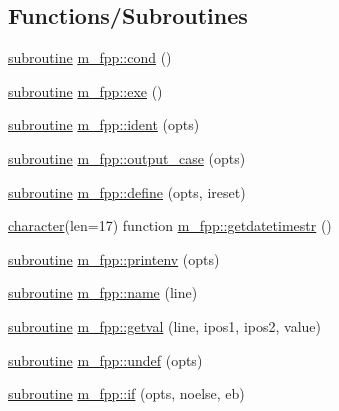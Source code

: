 \subsection*{Functions/\+Subroutines}
\begin{DoxyCompactItemize}
\item 
\hyperlink{M__stopwatch_83_8txt_acfbcff50169d691ff02d4a123ed70482}{subroutine} \hyperlink{namespacem__fpp_a3aa7c291b265d02ad91b3bb29e797156}{m\+\_\+fpp\+::cond} ()
\item 
\hyperlink{M__stopwatch_83_8txt_acfbcff50169d691ff02d4a123ed70482}{subroutine} \hyperlink{namespacem__fpp_a1149aa9cc5620d40fa315e4de3937776}{m\+\_\+fpp\+::exe} ()
\item 
\hyperlink{M__stopwatch_83_8txt_acfbcff50169d691ff02d4a123ed70482}{subroutine} \hyperlink{namespacem__fpp_afe91155aa0c891fc35f3927e777440ea}{m\+\_\+fpp\+::ident} (opts)
\item 
\hyperlink{M__stopwatch_83_8txt_acfbcff50169d691ff02d4a123ed70482}{subroutine} \hyperlink{namespacem__fpp_aeab3b5145d977b953ea972b2882e442a}{m\+\_\+fpp\+::output\+\_\+case} (opts)
\item 
\hyperlink{M__stopwatch_83_8txt_acfbcff50169d691ff02d4a123ed70482}{subroutine} \hyperlink{namespacem__fpp_a43f195db2d7dcdbaf89cb2e45ca60421}{m\+\_\+fpp\+::define} (opts, ireset)
\item 
\hyperlink{option__stopwatch_83_8txt_abd4b21fbbd175834027b5224bfe97e66}{character}(len=17) function \hyperlink{namespacem__fpp_aa52b30ff734a7831d3334aee5ef4e8e7}{m\+\_\+fpp\+::getdatetimestr} ()
\item 
\hyperlink{M__stopwatch_83_8txt_acfbcff50169d691ff02d4a123ed70482}{subroutine} \hyperlink{namespacem__fpp_a8034546d38694c17677cf638e2760d43}{m\+\_\+fpp\+::printenv} (opts)
\item 
\hyperlink{M__stopwatch_83_8txt_acfbcff50169d691ff02d4a123ed70482}{subroutine} \hyperlink{namespacem__fpp_ac32c830615f875efaf8678759daa7f39}{m\+\_\+fpp\+::name} (line)
\item 
\hyperlink{M__stopwatch_83_8txt_acfbcff50169d691ff02d4a123ed70482}{subroutine} \hyperlink{namespacem__fpp_a77ebcaafb7e1396c68dbc0bdcc088232}{m\+\_\+fpp\+::getval} (line, ipos1, ipos2, value)
\item 
\hyperlink{M__stopwatch_83_8txt_acfbcff50169d691ff02d4a123ed70482}{subroutine} \hyperlink{namespacem__fpp_aa3c22b47ddfcf47940f8254d4a44c448}{m\+\_\+fpp\+::undef} (opts)
\item 
\hyperlink{M__stopwatch_83_8txt_acfbcff50169d691ff02d4a123ed70482}{subroutine} \hyperlink{namespacem__fpp_a4866adfbe17fb5cc245f2ad058bb47f2}{m\+\_\+fpp\+::if} (opts, noelse, eb)

\end{DoxyCompactItemize}
